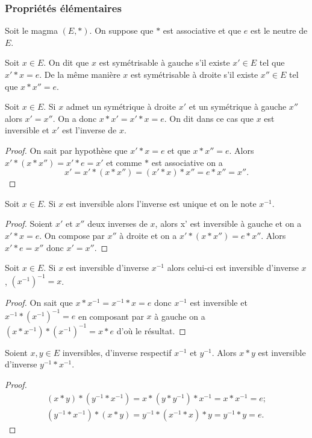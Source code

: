 \subsubsection{Propriétés  élémentaires}
Soit le magma $(E,*)$. On suppose que $*$ est associative et que $e$ est le neutre de $E$.
\begin{defdef}
  Soit $x \in E$. On dit que $x$ est symétrisable à gauche s'il existe $x' \in E$ tel que $x' * x=e$. De la même manière $x$ est symétrisable à droite s'il existe $x'' \in E$ tel que $x * x''=e$.
\end{defdef}
\begin{prop}
  Soit $x \in E$. Si $x$ admet un symétrique à droite $x'$ et un symétrique à gauche $x''$ alors $x'=x''$. On a donc $x*x'=x'*x=e$. On dit dans ce cas que $x$ est inversible et $x'$ est l'inverse de $x$.
\end{prop}
\begin{proof}
  On sait par hypothèse que $x'*x=e$ et que $x*x''=e$. Alors $x'*(x*x'')=x'*e=x'$ et comme $*$ est associative on a
  \begin{equation}
    x'=x'*(x*x'')=(x'*x)*x''=e*x''=x''.
  \end{equation}
\end{proof}
\begin{prop}
  Soit $x \in E$. Si $x$ est inversible alors l'inverse est unique et on le note $x^{-1}$.
\end{prop}
\begin{proof}
  Soient $x'$ et $x''$ deux inverses de $x$, alors x' est inversible à gauche et on a $x'*x=e$. On compose par $x''$ à droite et on a $x'*(x*x'')=e*x''$. Alors $x'*e=x''$ donc $x'=x''$.
\end{proof}
\begin{prop}
  Soit $x \in E$. Si $x$ est inversible d'inverse $x^{-1}$ alors celui-ci est inversible d'inverse $x$, $(x^{-1})^{-1}=x$.
\end{prop}
\begin{proof}
  On sait que $x*x^{-1}=x^{-1}*x=e$ donc $x^{-1}$ est inversible et $x^{-1}*(x^{-1})^{-1}=e$ en composant par $x$ à gauche on a $(x*x^{-1})*(x^{-1})^{-1}=x*e$ d'où le résultat.
\end{proof}
\begin{prop}
  Soient $x,y \in E$ inversibles, d'inverse respectif $x^{-1}$ et $y^{-1}$. Alors $x*y$ est inversible d'inverse $y^{-1}*x^{-1}$.
\end{prop}
\begin{proof}
  \begin{gather}
    (x*y)*(y^{-1}*x^{-1}) = x*(y*y^{-1})*x^{-1}=x*x^{-1}=e; \\
    (y^{-1}*x^{-1})*(x*y) = y^{-1}*(x^{-1}*x)*y=y^{-1}*y=e.
  \end{gather}
\end{proof}
